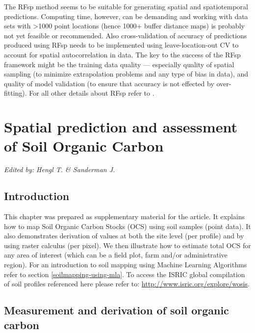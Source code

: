 \documentclass[graybox,natbib,nospthms,UStrade]{svmono}
\begin{document}
The RFsp method seems to be suitable for generating spatial and spatiotemporal predictions.
Computing time, however, can be demanding and working with data sets with \textgreater{}1000
point locations (hence 1000+ buffer distance maps) is probably not yet feasible or recommended.
Also cross-validation of accuracy of predictions produced using RFsp needs to be
implemented using leave-location-out CV to account for spatial autocorrelation in data.
The key to the success of the RFsp framework might be the training data quality ---
especially quality of spatial sampling (to minimize extrapolation problems and any
type of bias in data), and quality of model validation (to ensure that accuracy is
not effected by over-fitting). For all other details about RFsp refer to \citet{Hengl2018RFsp}.

\hypertarget{SOC-chapter}{%
\chapter{Spatial prediction and assessment of Soil Organic Carbon}\label{SOC-chapter}}

\emph{Edited by: Hengl T. \& Sanderman J.}

\hypertarget{introduction-2}{%
\section{Introduction}\label{introduction-2}}

This chapter was prepared as supplementary material for the \citet{sanderman2018soil} article. It explains how to map Soil Organic Carbon Stocks (OCS) using soil samples (point data). It also demonstrates derivation of values at both the site level (per profile) and by using raster calculus (per pixel). We then illustrate how to estimate total OCS for any area of interest (which can be a field plot, farm and/or administrative region). For an introduction to soil mapping using Machine Learning Algorithms refer to section \ref{soilmapping-using-mla}. To access the ISRIC global compilation of soil profiles referenced here please refer to: \url{http://www.isric.org/explore/wosis}.

\hypertarget{measurement-and-derivation-of-soil-organic-carbon}{%
\section{Measurement and derivation of soil organic carbon}\label{measurement-and-derivation-of-soil-organic-carbon}}
\end{document}
